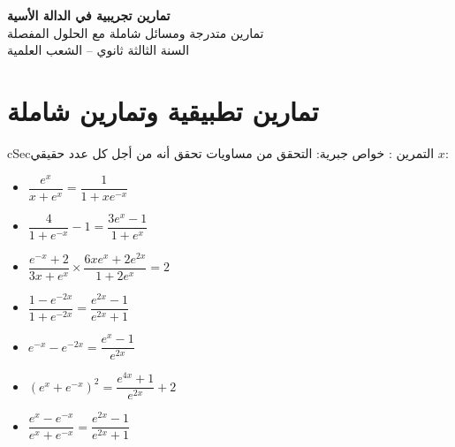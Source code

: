 \documentclass[12pt,a4paper]{article}
\newenvironment{BOX}[2]{\begin{otherlanguage}{english}\begin{arbox}{#1}{#2}}{\end{arbox}\end{otherlanguage}}
\newcounter{exo}
\newenvironment{tamrin}[1]{\stepcounter{exo}\begin{BOX}{cSec}{التمرين \theexo: #1}}{\end{BOX}}
\newenvironment{LTR}{\begin{otherlanguage}{english}}{\end{otherlanguage}}
\newenvironment{sq}{\begin{itemize}[leftmargin=2.4em,itemsep=3pt]}{\end{itemize}}
\newcommand{\qa}{\item[(أ)]}\newcommand{\qb}{\item[(ب)]}\newcommand{\qc}{\item[(جـ)]}\newcommand{\qd}{\item[(د)]}\newcommand{\qe}{\item[(هـ)]}
\begin{document}
\begin{LTR}
\begin{tcolorbox}[enhanced,colback=cSec,colframe=cSec,arc=3mm,halign=center,boxrule=0pt,top=12pt,bottom=12pt,before upper={\selectlanguage{arabic}}]
{\color{white}\fontsize{24}{30}\selectfont\bfseries تمارين تجريبية في الدالة الأسية}\\[8pt]
{\color{white}\large تمارين متدرجة ومسائل شاملة مع الحلول المفصلة}\\[5pt]
{\color{white}\large السنة الثالثة ثانوي -- الشعب العلمية}
\end{tcolorbox}
\end{LTR}
\section{تمارين تطبيقية وتمارين شاملة}
\begin{tamrin}{خواص جبرية: التحقق من مساويات}
تحقق أنه من أجل كل عدد حقيقي $x$:
\begin{sq}
\qa $\dfrac{e^{x}}{x+e^{x}}=\dfrac{1}{1+xe^{-x}}$
\qb $\dfrac{4}{1+e^{-x}}-1=\dfrac{3e^{x}-1}{1+e^{x}}$
\qc $\dfrac{e^{-x}+2}{3x+e^{x}}\times\dfrac{6xe^{x}+2e^{2x}}{1+2e^{x}}=2$
\qd $\dfrac{1-e^{-2x}}{1+e^{-2x}}=\dfrac{e^{2x}-1}{e^{2x}+1}$
\qe $e^{-x}-e^{-2x}=\dfrac{e^{x}-1}{e^{2x}}$
\item[(و)] $\left(e^{x}+e^{-x}\right)^{2}=\dfrac{e^{4x}+1}{e^{2x}}+2$
\item[(ز)] $\dfrac{e^{x}-e^{-x}}{e^{x}+e^{-x}}=\dfrac{e^{2x}-1}{e^{2x}+1}$
\end{sq}
\end{tamrin}
\end{document}
